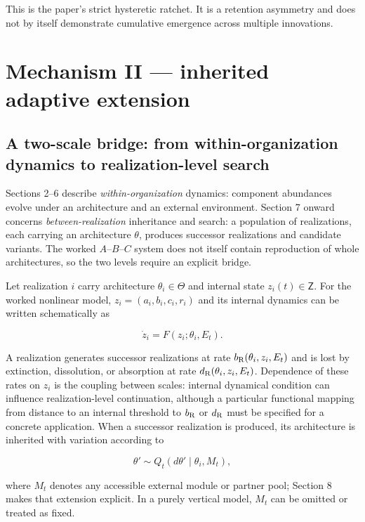 \documentclass[11pt,a4paper]{article}
\begin{document}
This is the paper's strict hysteretic ratchet. It is a retention asymmetry and does not by itself demonstrate cumulative emergence across multiple innovations.

\section{Mechanism II --- inherited adaptive extension}

\subsection{A two-scale bridge: from within-organization dynamics to realization-level search}

Sections 2--6 describe \emph{within-organization} dynamics: component abundances evolve under an architecture and an external environment. Section 7 onward concerns \emph{between-realization} inheritance and search: a population of realizations, each carrying an architecture $\theta$, produces successor realizations and candidate variants. The worked $A$--$B$--$C$ system does not itself contain reproduction of whole architectures, so the two levels require an explicit bridge.

Let realization $i$ carry architecture $\theta_i\in\mathsf\Theta$ and internal state $z_i(t)\in\mathsf Z$. For the worked nonlinear model, $z_i=(a_i,b_i,c_i,r_i)$ and its internal dynamics can be written schematically as

\begin{equation}
\dot z_i=F(z_i;\theta_i,E_t).
\label{eq:two-scale-internal}
\end{equation}

A realization generates successor realizations at rate $b_{\rm R}(\theta_i,z_i,E_t)$ and is lost by extinction, dissolution, or absorption at rate $d_{\rm R}(\theta_i,z_i,E_t)$. Dependence of these rates on $z_i$ is the coupling between scales: internal dynamical condition can influence realization-level continuation, although a particular functional mapping from distance to an internal threshold to $b_{\rm R}$ or $d_{\rm R}$ must be specified for a concrete application. When a successor realization is produced, its architecture is inherited with variation according to

\begin{equation}
\theta'\sim Q_t(d\theta'\mid\theta_i,M_t),
\label{eq:two-scale-inheritance}
\end{equation}

where $M_t$ denotes any accessible external module or partner pool; Section 8 makes that extension explicit. In a purely vertical model, $M_t$ can be omitted or treated as fixed.
\end{document}
